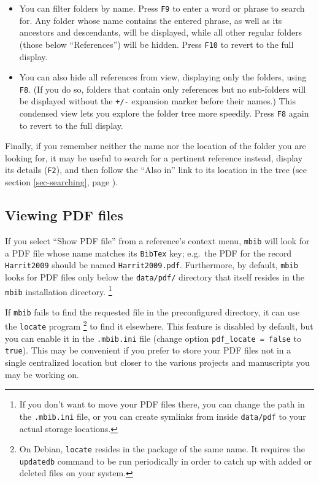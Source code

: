 \documentclass[10pt]{article}
\newcommand*{\mbib}{\texttt{mbib}\xspace}
\newcommand*{\bibtex}{\texttt{BibTex}\xspace}
\newcommand*{\ini}{\texttt{.mbib.ini}\xspace}
\newcommand*{\key}[1]{\texttt{#1}\xspace}
\begin{document}
\begin{itemize}
\item You can filter folders by name. Press \key{F9} to enter a word or phrase to search for. Any folder whose name contains the entered phrase, as well as its ancestors and descendants, will be displayed, while all other regular folders (those below ``References'') will be hidden. Press \key{F10} to revert to the full display. 

\item You can also hide all references from view, displaying only the folders, using \key{F8}. (If you do so, folders that contain only references but no sub-folders will be displayed without the \texttt{+/-} expansion marker before their names.) This condensed view lets you explore the folder tree more speedily. Press \key{F8} again to revert to the full display. 
\end{itemize}

\noindent Finally, if you remember neither the name nor the location of the folder you are looking for, it may be useful to search for a pertinent reference instead, display its details (\key{F2}), and then follow the ``Also in'' link to its location in the tree (see section \ref{sec-searching}, page \pageref{pg-also-in}). 

\subsection{Viewing PDF files}

If you select ``Show PDF file'' from a reference's context menu, \mbib will look for a PDF file whose name matches its \bibtex key; e.g.\ the PDF for the record \texttt{Harrit2009} should be named \texttt{Harrit2009.pdf}. Furthermore, by default, \mbib looks for PDF files only below the \texttt{data/pdf/} directory that itself resides in the \mbib installation directory.%
%
\footnote{If you don't want to move your PDF files there, you can change the path in the \ini file, or you can create symlinks from inside \texttt{data/pdf} to your actual storage locations.}

If \mbib fails to find the requested file in the preconfigured directory, it can use the \texttt{locate} program%
%
\footnote{On Debian, \texttt{locate} resides in the package of the same name. It requires the \texttt{updatedb} command to be run periodically in order to catch up with added or deleted files on your system.}
%
to find it elsewhere. This feature is disabled by default, but you can enable it in the \ini file (change option \texttt{pdf\_locate = false} to \texttt{true}). This may be convenient if you prefer to store your PDF files not in a single centralized location but closer to the various projects and manuscripts you may be working on. 
\end{document}
